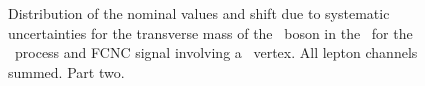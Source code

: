 \begin{figure}[htbp]
{	}
	\caption{Distribution of the nominal values and shift due to systematic uncertainties for the transverse mass of the \PW\ boson in the \STSR\ for the \WZ\ process and FCNC signal involving a \Zct\ vertex. All lepton channels summed. Part two.}
	\label{fig:shiftBDTSTZct}
\end{figure}
\newpage

